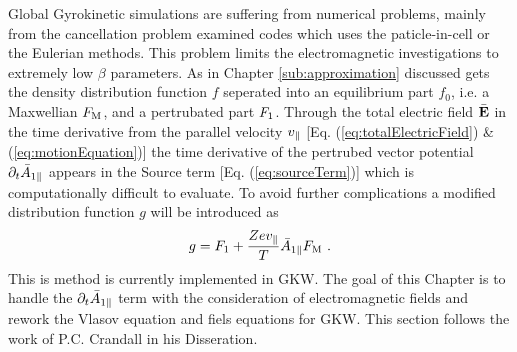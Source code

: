Global Gyrokinetic simulations are suffering from numerical problems, mainly from the cancellation problem \cite{Chen2001} examined codes \cite{Cummings_PHD} which uses the paticle-in-cell or the Eulerian methods. This problem limits the electromagnetic investigations to extremely low $\beta$ parameters. \cite{Naitou1995} As in Chapter \ref{sub:approximation} discussed gets the density distribution function $f$ seperated into an equilibrium part $f_0$, i.e. a Maxwellian $F_\mathrm{M}$, and a pertrubated part $F_1$. Through the total electric field $\bar{\boldsymbol{\mathbf{E}}}$ in the time derivative from the parallel velocity $v_\parallel$ [Eq. (\ref{eq:totalElectricField}) \& (\ref{eq:motionEquation})] the time derivative of the pertrubed vector potential $\partial_t \bar{A}_{1\parallel}$ appears in the Source term [Eq. (\ref{eq:sourceTerm})] which is computationally difficult to evaluate. To avoid further complications a modified distribution function $g$ will be introduced as
\begin{gather}
	g = F_1 + \frac{Ze v_\parallel}{T} \bar{A}_{1\parallel} F_\mathrm{M} ~.
	\label{eq:modifiedDistrubutionFunction}
\end{gather}
This is method is currently implemented in GKW\cite{Peeters2009A}. The goal of this Chapter is to handle the $\partial_t \bar{A}_{1\parallel}$ term with the consideration of electromagnetic fields and rework the Vlasov equation and fiels equations for GKW. This section follows the work of P.C. Crandall in his Disseration\cite{Crandall_PHD}.
\bigskip

